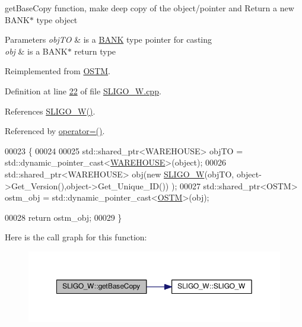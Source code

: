 get\+Base\+Copy function, make deep copy of the object/pointer and Return a new B\+A\+N\+K$\ast$ type object 


\begin{DoxyParams}{Parameters}
{\em obj\+TO} & is a \hyperlink{class_b_a_n_k}{B\+A\+NK} type pointer for casting \\
\hline
{\em obj} & is a B\+A\+N\+K$\ast$ return type \\
\hline
\end{DoxyParams}


Reimplemented from \hyperlink{class_o_s_t_m_a0bfa3763bd441407dd6365f42714f94c_a0bfa3763bd441407dd6365f42714f94c}{O\+S\+TM}.



Definition at line \hyperlink{_s_l_i_g_o___w_8cpp_source_l00022}{22} of file \hyperlink{_s_l_i_g_o___w_8cpp_source}{S\+L\+I\+G\+O\+\_\+\+W.\+cpp}.



References \hyperlink{_s_l_i_g_o___w_8h_source_l00024}{S\+L\+I\+G\+O\+\_\+\+W()}.



Referenced by \hyperlink{_s_l_i_g_o___w_8h_source_l00075}{operator=()}.


\begin{DoxyCode}
00023 \{
00024 
00025     std::shared\_ptr<WAREHOUSE> objTO = std::dynamic\_pointer\_cast<\hyperlink{class_w_a_r_e_h_o_u_s_e}{WAREHOUSE}>(object);
00026     std::shared\_ptr<WAREHOUSE> obj(\textcolor{keyword}{new} \hyperlink{class_s_l_i_g_o___w_a9b669809dc7cf8d9982181ac7997b0da_a9b669809dc7cf8d9982181ac7997b0da}{SLIGO\_W}(objTO, object->Get\_Version(),\textcolor{keywordtype}{object}->Get\_Unique\_ID())
      );
00027     std::shared\_ptr<OSTM> ostm\_obj = std::dynamic\_pointer\_cast<\hyperlink{class_o_s_t_m}{OSTM}>(obj);                             
           
00028     \textcolor{keywordflow}{return} ostm\_obj;
00029 \}
\end{DoxyCode}


Here is the call graph for this function\+:\nopagebreak
\begin{figure}[H]
\begin{center}
\leavevmode
\includegraphics[width=350pt]{class_s_l_i_g_o___w_a37ead49afd27bfe7e404d1d7626f09fe_a37ead49afd27bfe7e404d1d7626f09fe_cgraph}
\end{center}
\end{figure}


